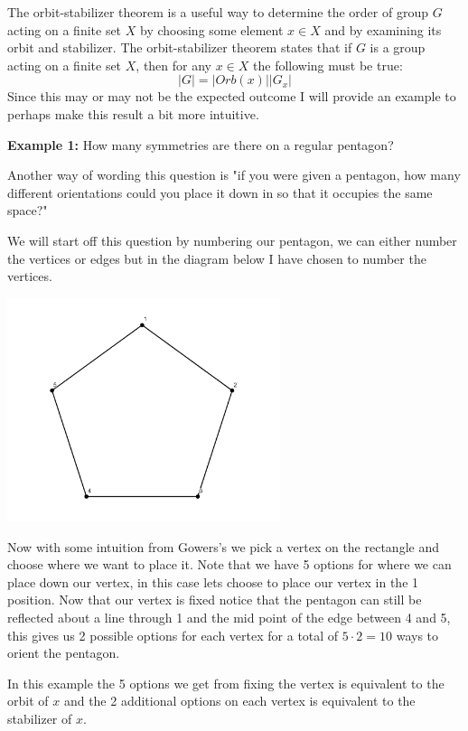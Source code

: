 \documentclass[../main.tex]{subfiles}
\begin{document}
The orbit-stabilizer theorem is a useful way to determine the order of group $G$ acting on a finite set $X$ by choosing some element $x \in X$ and by examining its orbit and stabilizer. The orbit-stabilizer theorem states that if $G$ is a group acting on a finite set $X$, then for any $x \in X$ the following must be true:
\begin{equation*}
\lvert G \rvert = \lvert Orb(x) \rvert \lvert G_x \rvert
\end{equation*}
Since this may or may not be the expected outcome I will provide an example to perhaps make this result a bit more intuitive.

\textbf{Example 1:} How many symmetries are there on a regular pentagon?

Another way of wording this question is "if you were given a pentagon, how many different orientations could you place it down in so that it occupies the same space?"

We will start off this question by numbering our pentagon, we can either number the vertices or edges but in the diagram below I have chosen to number the vertices.

\begin{center}
\includegraphics[width=80mm]{images/pentagon.png}   
\end{center}

Now with some intuition from Gowers's \cite{gowers} we pick a vertex on the rectangle and choose where we want to place it. Note that we have 5 options for where we can place down our vertex, in this case lets choose to place our vertex  in the 1 position. Now that our vertex is fixed notice that the pentagon can still be reflected about a line through 1 and the mid point of the edge between 4 and 5, this gives us 2 possible options for each vertex for a total of $5 \cdot 2 = 10$ ways to orient the pentagon.

In this example the 5 options we get from fixing the vertex is equivalent to the orbit of $x$ and the 2 additional options on each vertex is equivalent to the stabilizer of $x$.

    
    
\end{document}
